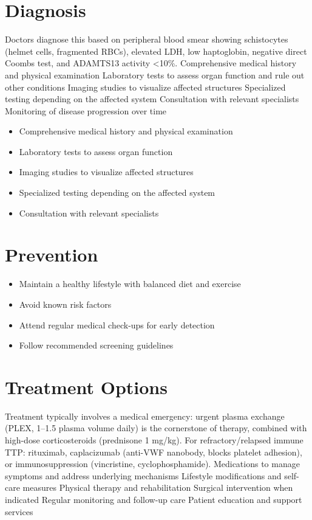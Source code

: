 \section{Diagnosis}
Doctors diagnose this based on peripheral blood smear showing schistocytes (helmet cells, fragmented RBCs), elevated LDH, low haptoglobin, negative direct Coombs test, and ADAMTS13 activity <10\%. Comprehensive medical history and physical examination Laboratory tests to assess organ function and rule out other conditions Imaging studies to visualize affected structures Specialized testing depending on the affected system Consultation with relevant specialists Monitoring of disease progression over time

\begin{itemize}[noitemsep]
  \item Comprehensive medical history and physical examination
  \item Laboratory tests to assess organ function
  \item Imaging studies to visualize affected structures
  \item Specialized testing depending on the affected system
  \item Consultation with relevant specialists
\end{itemize}
\section{Prevention}
\begin{itemize}[noitemsep]
  \item Maintain a healthy lifestyle with balanced diet and exercise
  \item Avoid known risk factors
  \item Attend regular medical check-ups for early detection
  \item Follow recommended screening guidelines
\end{itemize}
\section{Treatment Options}
Treatment typically involves a medical emergency: urgent plasma exchange (PLEX, 1--1.5 plasma volume daily) is the cornerstone of therapy, combined with high-dose corticosteroids (prednisone 1 mg/kg). For refractory/relapsed immune TTP: rituximab, caplacizumab (anti-VWF nanobody, blocks platelet adhesion), or immunosuppression (vincristine, cyclophosphamide). Medications to manage symptoms and address underlying mechanisms Lifestyle modifications and self-care measures Physical therapy and rehabilitation Surgical intervention when indicated Regular monitoring and follow-up care Patient education and support services

